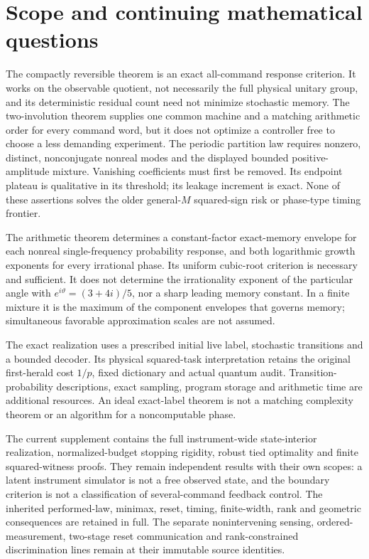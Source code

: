 \section{Scope and continuing mathematical questions}\label{sec:r72-scope}
The compactly reversible theorem is an exact all-command response criterion. It works on the observable quotient, not necessarily the full physical unitary group, and its deterministic residual count need not minimize stochastic memory. The two-involution theorem supplies one common machine and a matching arithmetic order for every command word, but it does not optimize a controller free to choose a less demanding experiment. The periodic partition law requires nonzero, distinct, nonconjugate nonreal modes and the displayed bounded positive-amplitude mixture. Vanishing coefficients must first be removed. Its endpoint plateau is qualitative in its threshold; its leakage increment is exact. None of these assertions solves the older general-$M$ squared-sign risk or phase-type timing frontier.

The arithmetic theorem determines a constant-factor exact-memory envelope for each nonreal single-frequency probability response, and both logarithmic growth exponents for every irrational phase. Its uniform cubic-root criterion is necessary and sufficient. It does not determine the irrationality exponent of the particular angle with $e^{i\vartheta}=(3+4i)/5$, nor a sharp leading memory constant. In a finite mixture it is the maximum of the component envelopes that governs memory; simultaneous favorable approximation scales are not assumed.

The exact realization uses a prescribed initial live label, stochastic transitions and a bounded decoder. Its physical squared-task interpretation retains the original first-herald cost $1/p$, fixed dictionary and actual quantum audit. Transition-probability descriptions, exact sampling, program storage and arithmetic time are additional resources. An ideal exact-label theorem is not a matching complexity theorem or an algorithm for a noncomputable phase.

The current supplement contains the full instrument-wide state-interior realization, normalized-budget stopping rigidity, robust tied optimality and finite squared-witness proofs. They remain independent results with their own scopes: a latent instrument simulator is not a free observed state, and the boundary criterion is not a classification of several-command feedback control. The inherited performed-law, minimax, reset, timing, finite-width, rank and geometric consequences are retained in full. The separate nonintervening sensing, ordered-measurement, two-stage reset communication and rank-constrained discrimination lines remain at their immutable source identities.

